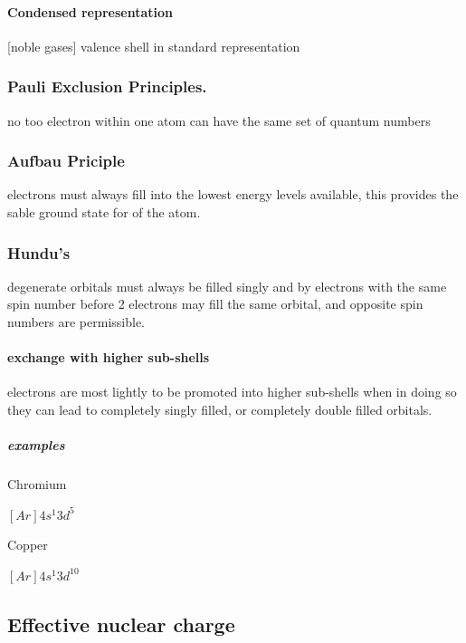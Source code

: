 \documentclass[]{article}
\let\oldparagraph\paragraph
\renewcommand{\paragraph}[1]{\oldparagraph{#1}\mbox{}}
\let\oldsubparagraph\subparagraph
\renewcommand{\subparagraph}[1]{\oldsubparagraph{#1}\mbox{}}
\begin{document}
\paragraph{Condensed representation}\label{condensed-representation}

{[}noble gases{]} valence shell in standard representation

\subsubsection{Pauli Exclusion
Principles.}\label{pauli-exclusion-principles.}

no too electron within one atom can have the same set of quantum numbers

\subsubsection{Aufbau Priciple}\label{aufbau-priciple}

electrons must always fill into the lowest energy levels available, this
provides the sable ground state for of the atom.

\subsubsection{Hundu's}\label{hundus}

degenerate orbitals must always be filled singly and by electrons with
the same spin number before 2 electrons may fill the same orbital, and
opposite spin numbers are permissible.

\paragraph{exchange with higher
sub-shells}\label{exchange-with-higher-sub-shells}

electrons are most lightly to be promoted into higher sub-shells when in
doing so they can lead to completely singly filled, or completely double
filled orbitals.

\subparagraph{examples}\label{examples}

Chromium

\([Ar]4s^{1}3d^{5}\)

Copper

\([Ar]4s^{1}3d^{10}\)

\subsection{Effective nuclear charge}\label{effective-nuclear-charge}
\end{document}
